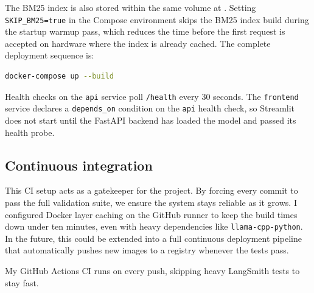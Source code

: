 The BM25 index is also stored within the same volume at . Setting \texttt{SKIP\_BM25=true} in the Compose environment skips the BM25 index build during the startup warmup pass, which reduces the time before the first request is accepted on hardware where the index is already cached. The complete deployment sequence is:

\begin{lstlisting}[language=bash, caption=Docker Compose deployment]
docker-compose up --build
\end{lstlisting}

Health checks on the \texttt{api} service poll \texttt{/health} every 30 seconds. The \texttt{frontend} service declares a \texttt{depends\_on} condition on the \texttt{api} health check, so Streamlit does not start until the FastAPI backend has loaded the model and passed its health probe.

\subsection{Continuous integration}

This CI setup acts as a gatekeeper for the project. By forcing every commit to pass the full validation suite, we ensure the system stays reliable as it grows. I configured Docker layer caching on the GitHub runner to keep the build times down under ten minutes, even with heavy dependencies like \texttt{llama-cpp-python}. In the future, this could be extended into a full continuous deployment pipeline that automatically pushes new images to a registry whenever the tests pass.

My GitHub Actions CI runs on every push, skipping heavy LangSmith tests to stay fast.


